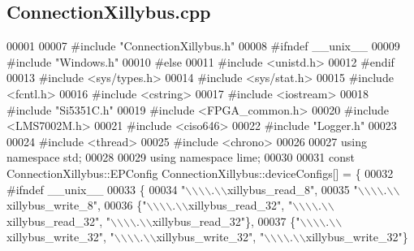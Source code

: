 \subsection{Connection\+Xillybus.\+cpp}
\label{ConnectionXillybus_8cpp_source}

\begin{DoxyCode}
00001 
00007 \textcolor{preprocessor}{#include "ConnectionXillybus.h"}
00008 \textcolor{preprocessor}{#ifndef \_\_unix\_\_}
00009 \textcolor{preprocessor}{#include "Windows.h"}
00010 \textcolor{preprocessor}{#else}
00011 \textcolor{preprocessor}{#include <unistd.h>}
00012 \textcolor{preprocessor}{#endif}
00013 \textcolor{preprocessor}{#include <sys/types.h>}
00014 \textcolor{preprocessor}{#include <sys/stat.h>}
00015 \textcolor{preprocessor}{#include <fcntl.h>}
00016 \textcolor{preprocessor}{#include <cstring>}
00017 \textcolor{preprocessor}{#include <iostream>}
00018 \textcolor{preprocessor}{#include "Si5351C.h"}
00019 \textcolor{preprocessor}{#include <FPGA_common.h>}
00020 \textcolor{preprocessor}{#include <LMS7002M.h>}
00021 \textcolor{preprocessor}{#include <ciso646>}
00022 \textcolor{preprocessor}{#include "Logger.h"}
00023 
00024 \textcolor{preprocessor}{#include <thread>}
00025 \textcolor{preprocessor}{#include <chrono>}
00026 
00027 \textcolor{keyword}{using namespace }std;
00028 
00029 \textcolor{keyword}{using namespace }lime;
00030 
00031 \textcolor{keyword}{const} ConnectionXillybus::EPConfig ConnectionXillybus::deviceConfigs[] = \{
00032 \textcolor{preprocessor}{#ifndef \_\_unix\_\_}
00033     \{
00034         \textcolor{stringliteral}{"\(\backslash\)\(\backslash\)\(\backslash\)\(\backslash\).\(\backslash\)\(\backslash\)xillybus\_read\_8"},
00035         \textcolor{stringliteral}{"\(\backslash\)\(\backslash\)\(\backslash\)\(\backslash\).\(\backslash\)\(\backslash\)xillybus\_write\_8"},
00036         \{\textcolor{stringliteral}{"\(\backslash\)\(\backslash\)\(\backslash\)\(\backslash\).\(\backslash\)\(\backslash\)xillybus\_read\_32"}, \textcolor{stringliteral}{"\(\backslash\)\(\backslash\)\(\backslash\)\(\backslash\).\(\backslash\)\(\backslash\)xillybus\_read\_32"}, \textcolor{stringliteral}{"\(\backslash\)\(\backslash\)\(\backslash\)\(\backslash\).\(\backslash\)\(\backslash\)xillybus\_read\_32"}\},
00037         \{\textcolor{stringliteral}{"\(\backslash\)\(\backslash\)\(\backslash\)\(\backslash\).\(\backslash\)\(\backslash\)xillybus\_write\_32"}, \textcolor{stringliteral}{"\(\backslash\)\(\backslash\)\(\backslash\)\(\backslash\).\(\backslash\)\(\backslash\)xillybus\_write\_32"}, \textcolor{stringliteral}{"\(\backslash\)\(\backslash\)\(\backslash\)\(\backslash\).\(\backslash\)\(\backslash\)xillybus\_write\_32"}\}

\end{DoxyCode}
